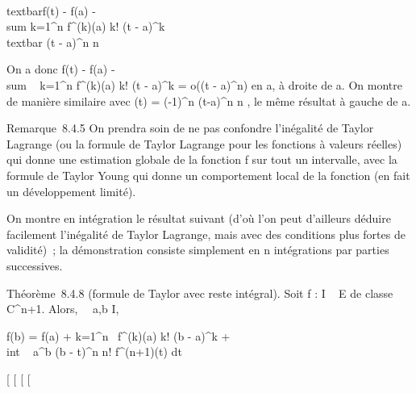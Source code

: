 \\textbar{}f(t) - f(a) -\\sum
k=1^n f^(k)(a) \over k!
(t - a)^k\\textbar{} \leq \epsilon(t - a)^n
\over n

On a donc f(t) - f(a)
-\\sum ~
k=1^n f^(k)(a) \over k!
(t - a)^k = o((t - a)^n) en a, à droite de a. On
montre de manière similaire avec \psi(t) = (-1)^n
\epsilon(t-a)^n \over n , le même résultat à gauche
de a.

Remarque~8.4.5 On prendra soin de ne pas confondre l'inégalité de Taylor
Lagrange (ou la formule de Taylor Lagrange pour les fonctions à valeurs
réelles) qui donne une estimation globale de la fonction f sur tout un
intervalle, avec la formule de Taylor Young qui donne un comportement
local de la fonction (en fait un développement limité).

On montre en intégration le résultat suivant (d'où l'on peut d'ailleurs
déduire facilement l'inégalité de Taylor Lagrange, mais avec des
conditions plus fortes de validité)~; la démonstration consiste
simplement en n intégrations par parties successives.

Théorème~8.4.8 (formule de Taylor avec reste intégral). Soit f : I \rightarrow~ E
de classe C^n+1. Alors, \forall~~a,b \in I,

f(b) = f(a) + \sum k=1^n~
f^(k)(a) \over k! (b - a)^k +
\\int  ~
a^b (b - t)^n \over n!
f^(n+1)(t) dt

{[}
{[}
{[}
{[}
